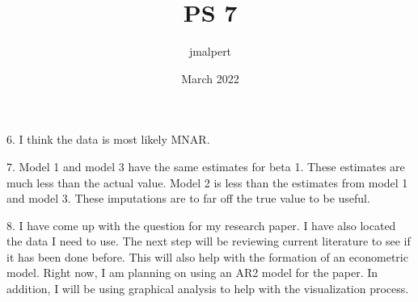 \documentclass{article}
\title{PS 7}
\author{jmalpert }
\date{March 2022}
\begin{document}
\maketitle

6. I think the data is most likely MNAR.

\vspace{2mm}

7. Model 1 and model 3 have the same estimates for beta 1.  These estimates are much less than the actual value.  Model 2 is less than the estimates from model 1 and model 3.  These imputations are to far off the true value to be useful.  

\vspace{2mm}

8. I have come up with the question for my research paper.  I have also located the data I need to use.  The next step will be reviewing current literature to see if it has been done before.  This will also help with the formation of an econometric model.  Right now, I am planning on using an AR2 model for the paper.  In addition, I will be using graphical analysis to help with the visualization process.  
\end{document}

